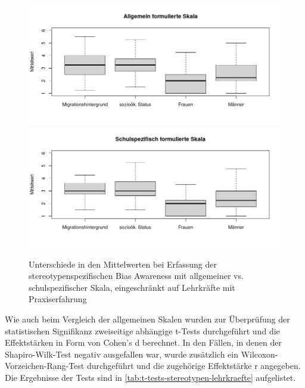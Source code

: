 \begin{figure}[h!]
	\includegraphics[width=\textwidth]{resources/boxplot-stereotypen-1-lehrkraefte.png}
	\includegraphics[width=\textwidth]{resources/boxplot-stereotypen-2-lehrkraefte.png}
	\caption{Unterschiede in den Mittelwerten bei Erfassung der stereotypenspezifischen Bias Awareness mit allgemeiner vs. schulspezifischer Skala, eingeschränkt auf Lehrkräfte mit Praxiserfahrung}
	\label{fig:boxplot-stereotypen-lehrkraefte}
\end{figure}

Wie auch beim Vergleich der allgemeinen Skalen wurden zur Überprüfung der statistischen Signifikanz zweiseitige abhängige t-Tests durchgeführt und die Effektstärken in Form von Cohen's d berechnet.
In den Fällen, in denen der Shapiro-Wilk-Test negativ ausgefallen war, wurde zusätzlich ein Wilcoxon-Vorzeichen-Rang-Test durchgeführt und die zugehörige Effektstärke r angegeben.
Die Ergebnisse der Tests sind in \autoref{tab:t-tests-stereotypen-lehrkraefte} aufgelistet.

